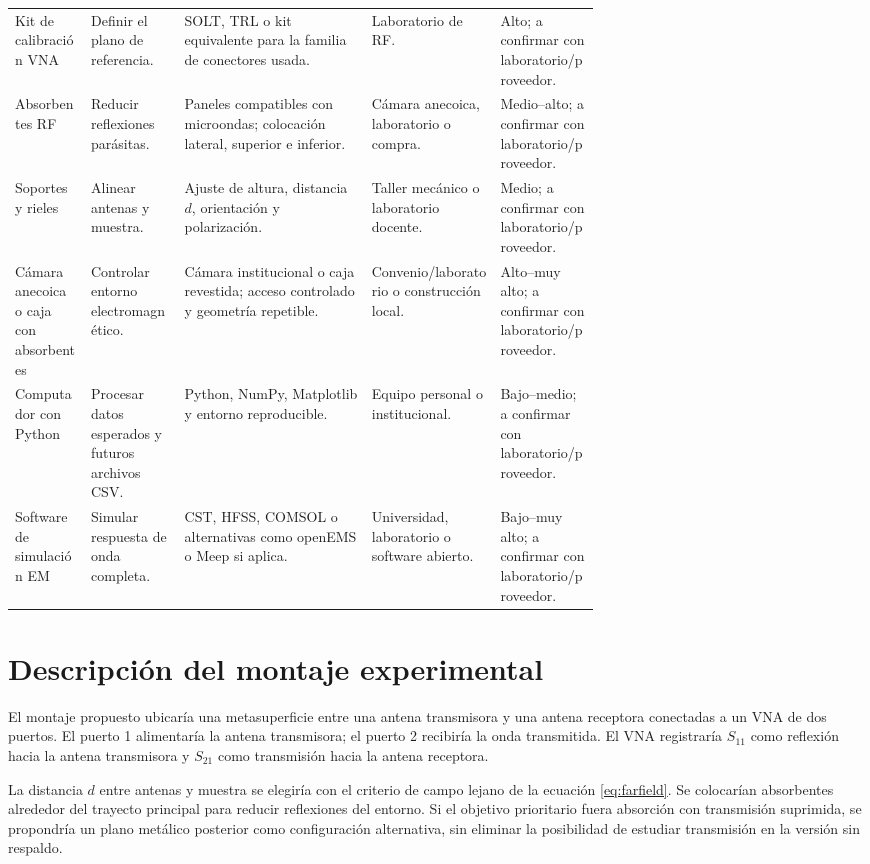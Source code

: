 \documentclass[12pt,a4paper]{article}
\begin{document}
\begin{table}[htbp]
\begin{tabularx}{\textwidth}{p{0.13\linewidth}p{0.16\linewidth}Y p{0.22\linewidth}p{0.17\linewidth}}
    Kit de calibración VNA & Definir el plano de referencia. & SOLT, TRL o kit equivalente para la familia de conectores usada. & Laboratorio de RF. & Alto; a confirmar con laboratorio/proveedor. \\
    Absorbentes RF & Reducir reflexiones parásitas. & Paneles compatibles con microondas; colocación lateral, superior e inferior. & Cámara anecoica, laboratorio o compra. & Medio--alto; a confirmar con laboratorio/proveedor. \\
    Soportes y rieles & Alinear antenas y muestra. & Ajuste de altura, distancia \(d\), orientación y polarización. & Taller mecánico o laboratorio docente. & Medio; a confirmar con laboratorio/proveedor. \\
    Cámara anecoica o caja con absorbentes & Controlar entorno electromagnético. & Cámara institucional o caja revestida; acceso controlado y geometría repetible. & Convenio/laboratorio o construcción local. & Alto--muy alto; a confirmar con laboratorio/proveedor. \\
    Computador con Python & Procesar datos esperados y futuros archivos CSV. & Python, NumPy, Matplotlib y entorno reproducible. & Equipo personal o institucional. & Bajo--medio; a confirmar con laboratorio/proveedor. \\
    Software de simulación EM & Simular respuesta de onda completa. & CST, HFSS, COMSOL o alternativas como openEMS o Meep si aplica. & Universidad, laboratorio o software abierto. & Bajo--muy alto; a confirmar con laboratorio/proveedor. \\
    \bottomrule
  \end{tabularx}
\end{table}

\section{Descripción del montaje experimental}

El montaje propuesto ubicaría una metasuperficie entre una antena transmisora y una antena receptora conectadas a un VNA de dos puertos. El puerto 1 alimentaría la antena transmisora; el puerto 2 recibiría la onda transmitida. El VNA registraría \(S_{11}\) como reflexión hacia la antena transmisora y \(S_{21}\) como transmisión hacia la antena receptora.

La distancia \(d\) entre antenas y muestra se elegiría con el criterio de campo lejano de la ecuación \eqref{eq:farfield}. Se colocarían absorbentes alrededor del trayecto principal para reducir reflexiones del entorno. Si el objetivo prioritario fuera absorción con transmisión suprimida, se propondría un plano metálico posterior como configuración alternativa, sin eliminar la posibilidad de estudiar transmisión en la versión sin respaldo.
\end{document}

